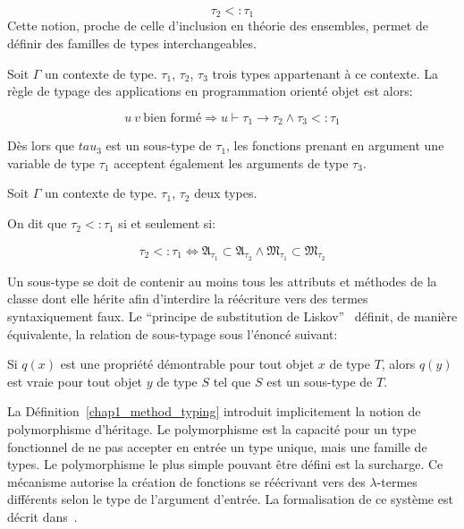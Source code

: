 \begin{equation}
  \tau_2 <: \tau_1
\end{equation}
%
%
Cette notion, proche de celle d'inclusion en théorie des ensembles,
permet de définir des familles de types interchangeables.
%
%
\begin{mydef}\label{chap1_oo_app}
  Soit $\Gamma$ un contexte de type. $\tau_1$, $\tau_2$, $\tau_3$
  trois types appartenant à ce contexte. La règle de typage des
  applications en programmation orienté objet est alors:


  \begin{equation}
    u~v~\text{bien formé} \Rightarrow u \vdash \tau_1 \rightarrow
    \tau_2 \wedge \tau_3 <: \tau_1
  \end{equation}

  Dès lors que $tau_3$ est un sous-type de $\tau_1$, les fonctions
  prenant en argument une variable de type $\tau_1$ acceptent
  également les arguments de type $\tau_3$.
\end{mydef}
%
\begin{mydef}\label{chap1_method_typing}
  Soit $\Gamma$ un contexte de type. $\tau_1$, $\tau_2$ deux types.

  On dit que $\tau_2 <: \tau_1$ si et seulement si:

  \begin{equation}
    \tau_2 <: \tau_1 \Leftrightarrow \mathfrak{A_{\tau_1}} \subset
    \mathfrak{A_{\tau_2}} \wedge \mathfrak{M_{\tau_1}} \subset
    \mathfrak{M_{\tau_2}}
  \end{equation}
\end{mydef}
%
Un sous-type se doit de contenir au moins tous les attributs et
méthodes de la classe dont elle hérite afin d'interdire la réécriture
vers des termes syntaxiquement faux. Le ``principe de substitution de
Liskov''~\citep{Liskov94familyvalues} définit, de manière équivalente,
la relation de sous-typage sous l'énoncé suivant:
%
\begin{mydef}\label{chap1_liskov}
  Si $q(x)$ est une propriété démontrable pour tout objet $x$ de type
  $T$, alors $q(y)$ est vraie pour tout objet $y$ de type $S$ tel que
  $S$ est un sous-type de $T$.
\end{mydef}


La Définition~\ref{chap1_method_typing} introduit implicitement la
notion de polymorphisme d'héritage. Le polymorphisme est la capacité
pour un type fonctionnel de ne pas accepter en entrée un type unique,
mais une famille de types. Le polymorphisme le plus simple pouvant
être défini est la surcharge. Ce mécanisme autorise
la création de fonctions se réécrivant vers des $\lambda$-termes
différents selon le type de l'argument d'entrée. La formalisation de
ce système est décrit dans~\citep{Castagna95acalculus}.

